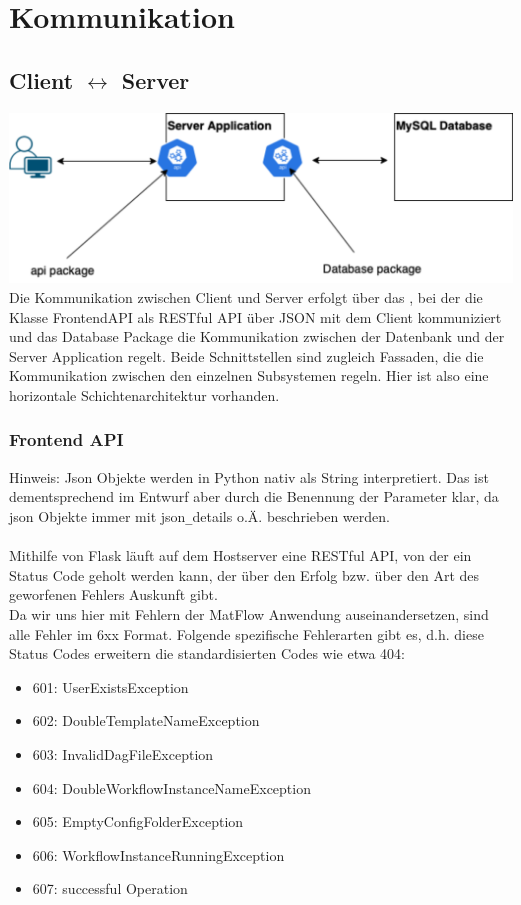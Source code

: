 \section{Kommunikation}

\subsection{Client $\leftrightarrow$ Server} 
\includegraphics[width=1\textwidth]{res/Kommunikation.png}
Die Kommunikation zwischen Client und Server erfolgt über das , bei der die Klasse FrontendAPI 
als RESTful API über JSON mit dem Client kommuniziert und das Database Package die Kommunikation 
zwischen der Datenbank und der Server Application regelt. Beide Schnittstellen sind zugleich Fassaden, die die Kommunikation
zwischen den einzelnen Subsystemen regeln.
Hier ist also eine horizontale Schichtenarchitektur vorhanden.

\subsubsection{Frontend API}
Hinweis: Json Objekte werden in Python nativ als String interpretiert. Das ist dementsprechend im Entwurf aber durch die 
Benennung der Parameter klar, da json Objekte immer mit json\texttt{\_}details o.Ä. beschrieben werden. \\ \\
Mithilfe von Flask läuft auf dem Hostserver eine RESTful API, von der ein Status Code geholt werden kann, der über den Erfolg 
bzw. über den Art des geworfenen Fehlers Auskunft gibt.\\ 
Da wir uns hier mit Fehlern der MatFlow Anwendung auseinandersetzen, sind alle Fehler im 6xx Format.
Folgende spezifische Fehlerarten gibt es, d.h. diese Status Codes erweitern die standardisierten Codes wie etwa 404:
\begin{itemize}
    \item 601: UserExistsException
    \item 602: DoubleTemplateNameException
    \item 603: InvalidDagFileException
    \item 604: DoubleWorkflowInstanceNameException
    \item 605: EmptyConfigFolderException
    \item 606: WorkflowInstanceRunningException
    \item 607: successful Operation
\end{itemize}

